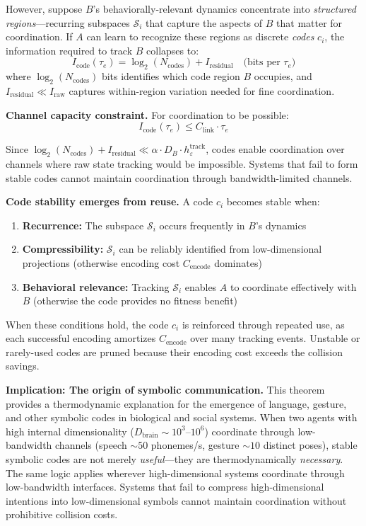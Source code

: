 \documentclass[12pt]{article}
\begin{document}
However, suppose $B$'s behaviorally-relevant dynamics concentrate into \textit{structured regions}---recurring subspaces $\mathcal{S}_i$ that capture the aspects of $B$ that matter for coordination. If $A$ can learn to recognize these regions as discrete \textit{codes} $c_i$, the information required to track $B$ collapses to:
\begin{equation}
I_{\text{code}}(\tau_e) = \log_2(N_{\text{codes}}) + I_{\text{residual}} \quad \text{(bits per $\tau_e$)}
\end{equation}
where $\log_2(N_{\text{codes}})$ bits identifies which code region $B$ occupies, and $I_{\text{residual}} \ll I_{\text{raw}}$ captures within-region variation needed for fine coordination.

\textbf{Channel capacity constraint.} For coordination to be possible:
\begin{equation}
I_{\text{code}}(\tau_e) \le C_{\text{link}} \cdot \tau_e
\end{equation}

Since $\log_2(N_{\text{codes}}) + I_{\text{residual}} \ll \alpha \cdot D_B \cdot h_\varepsilon^{\text{track}}$, codes enable coordination over channels where raw state tracking would be impossible. Systems that fail to form stable codes cannot maintain coordination through bandwidth-limited channels.

\textbf{Code stability emerges from reuse.} A code $c_i$ becomes stable when:
\begin{enumerate}
\item \textbf{Recurrence:} The subspace $\mathcal{S}_i$ occurs frequently in $B$'s dynamics
\item \textbf{Compressibility:} $\mathcal{S}_i$ can be reliably identified from low-dimensional projections (otherwise encoding cost $C_{\text{encode}}$ dominates)
\item \textbf{Behavioral relevance:} Tracking $\mathcal{S}_i$ enables $A$ to coordinate effectively with $B$ (otherwise the code provides no fitness benefit)
\end{enumerate}

When these conditions hold, the code $c_i$ is reinforced through repeated use, as each successful encoding amortizes $C_{\text{encode}}$ over many tracking events. Unstable or rarely-used codes are pruned because their encoding cost exceeds the collision savings.

\textbf{Implication: The origin of symbolic communication.} This theorem provides a thermodynamic explanation for the emergence of language, gesture, and other symbolic codes in biological and social systems. When two agents with high internal dimensionality ($D_{\text{brain}} \sim 10^3$--$10^6$) coordinate through low-bandwidth channels (speech $\sim 50$ phonemes/s, gesture $\sim 10$ distinct poses), stable symbolic codes are not merely \textit{useful}---they are thermodynamically \textit{necessary}. The same logic applies wherever high-dimensional systems coordinate through low-bandwidth interfaces. Systems that fail to compress high-dimensional intentions into low-dimensional symbols cannot maintain coordination without prohibitive collision costs.
\end{document}
